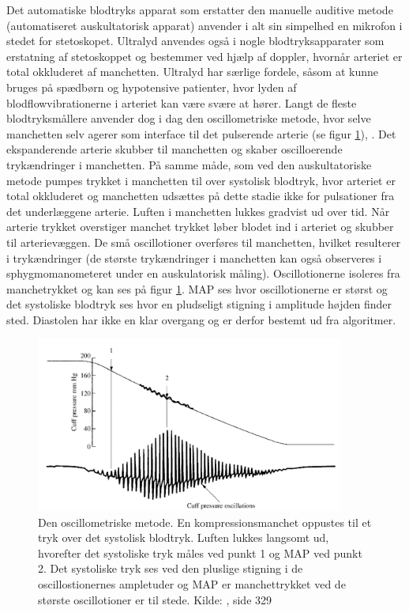 Det automatiske blodtryks apparat som erstatter den manuelle auditive metode (automatiseret auskultatorisk apparat) anvender i alt sin simpelhed en mikrofon i stedet for stetoskopet. Ultralyd anvendes også i nogle blodtryksapparater som erstatning af stetoskoppet og bestemmer ved hjælp af doppler, hvornår arteriet er total okkluderet af manchetten. Ultralyd har særlige fordele, såsom at kunne bruges på spædbørn og hypotensive patienter, hvor lyden af blodflowvibrationerne i arteriet kan være svære at hører. Langt de fleste blodtryksmållere anvender dog i dag den oscillometriske metode, hvor selve manchetten selv agerer som interface til det pulserende arterie (se figur \ref{fig:OscillometriskMetode}), \cite{RefWorks:24} . Det ekspanderende arterie skubber til manchetten og skaber oscilloerende trykændringer i manchetten. På samme måde, som ved den auskultatoriske metode pumpes trykket i manchetten til over systolisk blodtryk, hvor arteriet er total okkluderet og manchetten udsættes på dette stadie ikke for pulsationer fra det underlæggene arterie. Luften i manchetten lukkes gradvist ud over tid. Når arterie trykket overstiger manchet trykket løber blodet ind i arteriet og skubber til arterievæggen. De små oscillotioner overføres til manchetten, hvilket resulterer i trykændringer (de største trykændringer i manchetten kan også observeres i sphygmomanometeret under en auskulatorisk måling). Oscillotionerne isoleres fra manchetrykket og kan ses på figur \ref{fig:OscillometriskMetode}. MAP ses hvor oscillotionerne er størst og det systoliske blodtryk ses hvor en pludseligt stigning i amplitude højden finder sted. Diastolen har ikke en klar overgang og er derfor bestemt ud fra algoritmer.

\begin{figure}[H]
	\includegraphics[width=0.9\textwidth]{billeder/OscillometriskMetode.png}
	\caption{Den oscillometriske metode. En kompressionsmanchet oppustes til et tryk over det systolisk blodtryk. Luften lukkes langsomt ud, hvorefter det systoliske tryk måles ved punkt 1 og MAP ved punkt 2. Det systoliske tryk ses ved den pluslige stigning i de oscillostionernes ampletuder og MAP er manchettrykket ved de største oscillotioner er til stede. Kilde: \cite{RefWorks:27}, side 329} \label{fig:OscillometriskMetode}
\end{figure}

